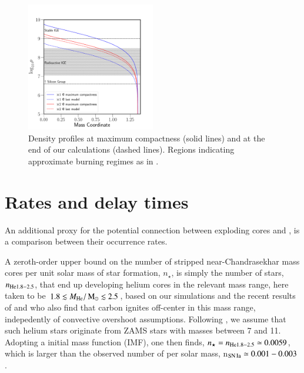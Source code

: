 \documentclass[twocolumn]{aa}
\begin{document}
\begin{figure}
\begin{center}
\includegraphics[width=0.5\textwidth]{composition.pdf}
\caption{Density profiles at maximum compactness (solid lines) and at the end of our \mesa calculations (dashed lines). Regions indicating approximate burning regimes as in \cite{Seitenzahl2017}.}
\label{fig:nuc}
\end{center}
\end{figure}


\section{Rates and delay times}\label{sec:4}
An additional  proxy for the potential connection between exploding \one cores and \ia, is a comparison between their  occurrence rates. 

A zeroth-order upper bound on the number of stripped near-Chandrasekhar mass \one cores per unit solar mass of star formation, $n_\star$, is 
simply the number of stars, $n_{\rm{He}1.8-2.5}$, that end up developing  helium cores in the relevant mass range, here taken to be $1.8\lesssim M_{\rm{He}}/\mathrm{\,M_\odot} \lesssim 2.5$, based on our simulations and the recent results of \cite{Woosley:2019sdf} and \cite{Farmer:2015afs} who also find that carbon ignites off-center in this mass range, indepedently of convective overshoot assumptions. Following 
\cite{Farmer:2015afs}, we assume that such helium stars originate from ZAMS stars with masses between 7 and 11\msun. Adopting a \cite{Chabrier:2004vw} initial mass function (IMF), one then finds,  $n_\star=n_{\rm{He}1.8-2.5}\simeq 0.0059$, which is larger than the observed number of \ias per solar mass, n$_{\rm SN\,Ia}\simeq 0.001-0.003$ \citep[e.g][]{claeys2014a,Maoz:2013hna}.
\end{document}
